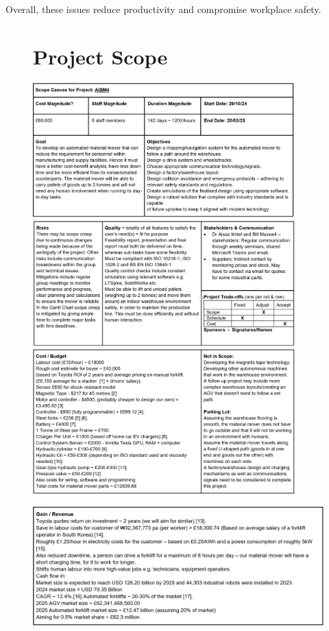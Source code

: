 \documentclass[12pt]{article}
\begin{document}
Overall, these issues reduce productivity and compromise workplace safety.



\begin{figure}[htbp]
\section{Project Scope}
    \centering
     \includegraphics[width=0.9\textwidth]{Scope Canvas 1.png}
     \includegraphics[width=0.9\textwidth]{Scope Canvas 2.png}
     \includegraphics[width=0.9\textwidth]{Scope Canvas 3.png}
   

\end{figure}
\clearpage
\begin{figure}[htbp]

    \centering
     \includegraphics[width=1\textwidth]{Scope Canvas 4.png}
\end{figure}
\end{document}
